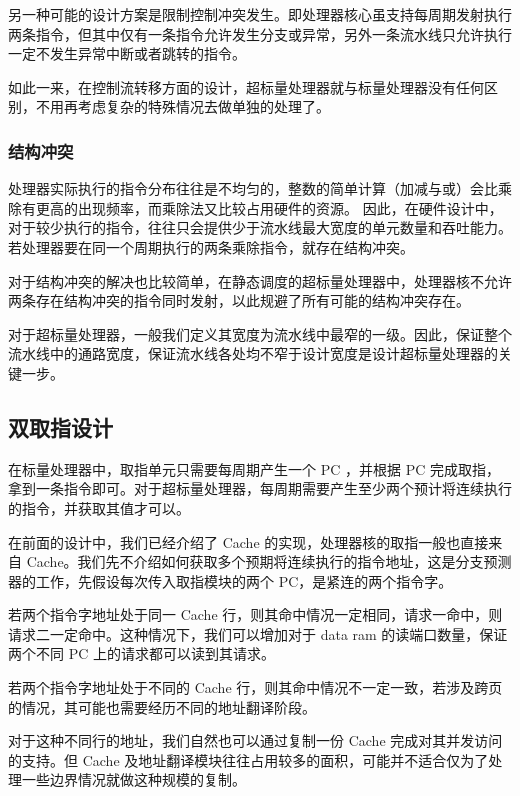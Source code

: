 另一种可能的设计方案是限制控制冲突发生。即处理器核心虽支持每周期发射执行两条指令，但其中仅有一条指令允许发生分支或异常，另外一条流水线只允许执行一定不发生异常中断或者跳转的指令。

如此一来，在控制流转移方面的设计，超标量处理器就与标量处理器没有任何区别，不用再考虑复杂的特殊情况去做单独的处理了。

\subsubsection{结构冲突}\label{sec:11-advanced-cpu-010}

处理器实际执行的指令分布往往是不均匀的，整数的简单计算（加减与或）会比乘除有更高的出现频率，而乘除法又比较占用硬件的资源。
因此，在硬件设计中，对于较少执行的指令，往往只会提供少于流水线最大宽度的单元数量和吞吐能力。若处理器要在同一个周期执行的两条乘除指令，就存在结构冲突。

对于结构冲突的解决也比较简单，在静态调度的超标量处理器中，处理器核不允许两条存在结构冲突的指令同时发射，以此规避了所有可能的结构冲突存在。

对于超标量处理器，一般我们定义其宽度为流水线中最窄的一级。因此，保证整个流水线中的通路宽度，保证流水线各处均不窄于设计宽度是设计超标量处理器的关键一步。

\subsection{双取指设计}\label{sec:11-advanced-cpu-011}

在标量处理器中，取指单元只需要每周期产生一个 PC ，并根据 PC 完成取指，拿到一条指令即可。对于超标量处理器，每周期需要产生至少两个预计将连续执行的指令，并获取其值才可以。

在前面的设计中，我们已经介绍了 Cache 的实现，处理器核的取指一般也直接来自 Cache。我们先不介绍如何获取多个预期将连续执行的指令地址，这是分支预测器的工作，先假设每次传入取指模块的两个 PC，是紧连的两个指令字。

若两个指令字地址处于同一 Cache 行，则其命中情况一定相同，请求一命中，则请求二一定命中。这种情况下，我们可以增加对于 data ram 的读端口数量，保证两个不同 PC 上的请求都可以读到其请求。

若两个指令字地址处于不同的 Cache 行，则其命中情况不一定一致，若涉及跨页的情况，其可能也需要经历不同的地址翻译阶段。

对于这种不同行的地址，我们自然也可以通过复制一份 Cache 完成对其并发访问的支持。但 Cache 及地址翻译模块往往占用较多的面积，可能并不适合仅为了处理一些边界情况就做这种规模的复制。

